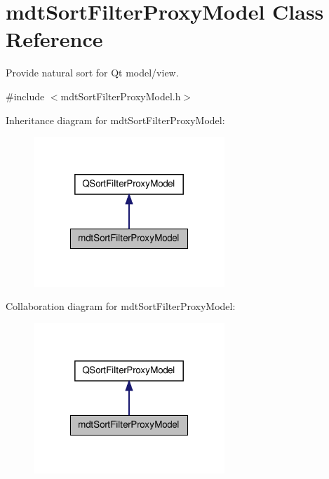 \hypertarget{classmdt_sort_filter_proxy_model}{\section{mdt\-Sort\-Filter\-Proxy\-Model Class Reference}
\label{classmdt_sort_filter_proxy_model}
}


Provide natural sort for Qt model/view.  




{\ttfamily \#include $<$mdt\-Sort\-Filter\-Proxy\-Model.\-h$>$}



Inheritance diagram for mdt\-Sort\-Filter\-Proxy\-Model\-:
\nopagebreak
\begin{figure}[H]
\begin{center}
\leavevmode
\includegraphics[width=204pt]{classmdt_sort_filter_proxy_model__inherit__graph}
\end{center}
\end{figure}


Collaboration diagram for mdt\-Sort\-Filter\-Proxy\-Model\-:
\nopagebreak
\begin{figure}[H]
\begin{center}
\leavevmode
\includegraphics[width=204pt]{classmdt_sort_filter_proxy_model__coll__graph}
\end{center}
\end{figure}
